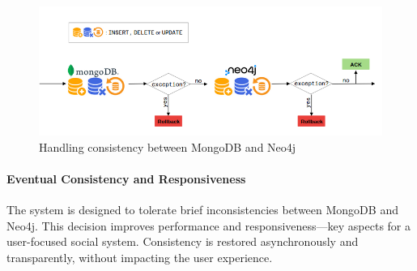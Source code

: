 \begin{figure}[!h]
    \centering
    \includegraphics[scale=0.5]{./resources/rollback.png}
    \caption{Handling consistency between MongoDB and Neo4j}
    \label{fig:mongo-neo4j-sync}
\end{figure}

\paragraph{Eventual Consistency and Responsiveness}

The system is designed to tolerate brief inconsistencies between MongoDB and Neo4j. This decision improves performance and responsiveness—key aspects for a user-focused social system. Consistency is restored asynchronously and transparently, without impacting the user experience.
